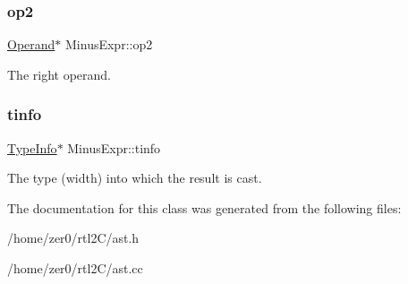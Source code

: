 \subsubsection{\texorpdfstring{op2}{op2}}
{\footnotesize\ttfamily \hyperlink{class_operand}{Operand}$\ast$ Minus\+Expr\+::op2\hspace{0.3cm}{\ttfamily [protected]}}

The right operand. \mbox{\label{class_minus_expr_a974e557c0b440352c557c760f689bf52}} 
\subsubsection{\texorpdfstring{tinfo}{tinfo}}
{\footnotesize\ttfamily \hyperlink{class_type_info}{Type\+Info}$\ast$ Minus\+Expr\+::tinfo\hspace{0.3cm}{\ttfamily [protected]}}

The type (width) into which the result is cast. 

The documentation for this class was generated from the following files\+:\begin{DoxyCompactItemize}
\item 
/home/zer0/rtl2\+C/ast.\+h\item 
/home/zer0/rtl2\+C/ast.\+cc\end{DoxyCompactItemize}
